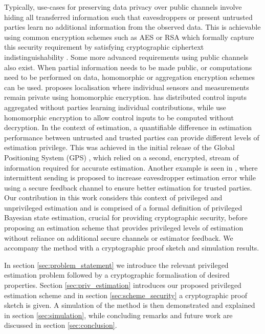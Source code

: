 \documentclass[letterpaper, 10 pt, conference]{IEEEtran}
\theoremstyle{definition}
\begin{document}
Typically, use-cases for preserving data privacy over public channels involve hiding all transferred information such that eavesdroppers or present untrusted parties learn no additional information from the observed data. This is achievable using common encryption schemes such as AES \cite{gueronIntelAdvancedEncryption2010} or RSA \cite{rivestMethodObtainingDigital1978} which formally capture this security requirement by satisfying cryptographic ciphertext indistinguishability \cite{katzIntroductionModernCryptography2008}. Some more advanced requirements using public channels also exist. When partial information needs to be made public, or computations need to be performed on data, homomorphic or aggregation encryption schemes can be used. \cite{alanwarPrOLocResilientLocalization2017} proposes localisation where individual sensors and measurements remain private using homomorphic encryption. \cite{alexandruPrivateWeightedSum2020} has distributed control inputs aggregated without parties learning individual contributions, while \cite{alexandruEncryptedCooperativeControl2019,farokhiSecurePrivateControl2017} use homomorphic encryption to allow control inputs to be computed without decryption. In the context of estimation, a quantifiable difference in estimation performance between untrusted and trusted parties can provide different levels of estimation privilege. This was achieved in the initial release of the Global Positioning System (GPS) \cite{grovesPrinciplesGNSSInertial2015}, which relied on a second, encrypted, stream of information required for accurate estimation. Another example is seen in \cite{leongTransmissionSchedulingRemote2019}, where intermittent sending is proposed to increase eavesdropper estimation error while using a secure feedback channel to ensure better estimation for trusted parties. Our contribution in this work considers this context of privileged and unprivileged estimation and is comprised of a formal definition of privileged Bayesian state estimation, crucial for providing cryptographic security, before proposing an estimation scheme that provides privileged levels of estimation without reliance on additional secure channels or estimator feedback. We accompany the method with a cryptographic proof sketch and simulation results.

In section \ref{sec:problem_statement} we introduce the relevant privileged estimation problem followed by a cryptographic formalisation of desired properties. Section \ref{sec:priv_estimation} introduces our proposed privileged estimation scheme and in section \ref{sec:scheme_security} a cryptographic proof sketch is given. A simulation of the method is then demonstrated and explained in section \ref{sec:simulation}, while concluding remarks and future work are discussed in section \ref{sec:conclusion}.
\end{document}
